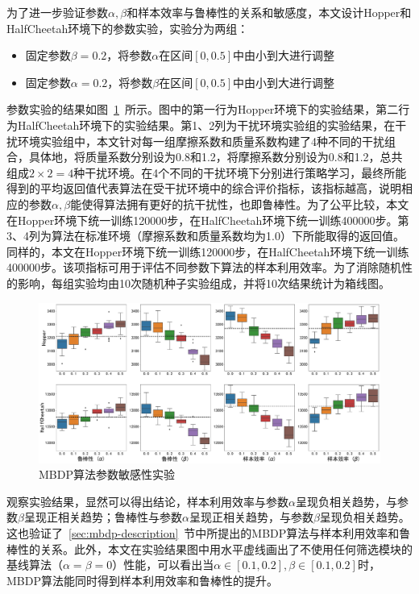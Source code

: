 为了进一步验证参数$\alpha,\beta$和样本效率与鲁棒性的关系和敏感度，本文设计Hopper和HalfCheetah环境下的参数实验，实验分为两组：

\begin{itemize}
    \item 固定参数$\beta=0.2$，将参数$\alpha$在区间$[0,0.5]$中由小到大进行调整
    \item 固定参数$\alpha=0.2$，将参数$\beta$在区间$[0,0.5]$中由小到大进行调整
\end{itemize}

参数实验的结果如图~\ref{fig:hyper-performance}~所示。图中的第一行为Hopper环境下的实验结果，第二行为HalfCheetah环境下的实验结果。第1、2列为干扰环境实验组的实验结果，在干扰环境实验组中，本文针对每一组摩擦系数和质量系数构建了4种不同的干扰组合，具体地，将质量系数分别设为0.8和1.2，将摩擦系数分别设为0.8和1.2，总共组成$2\times 2=4$种干扰环境。在4个不同的干扰环境下分别进行策略学习，最终所能得到的平均返回值代表算法在受干扰环境中的综合评价指标，该指标越高，说明相应的参数$\alpha,\beta$能使得算法拥有更好的抗干扰性，也即鲁棒性。为了公平比较，本文在Hopper环境下统一训练120000步，在HalfCheetah环境下统一训练400000步。第3、4列为算法在标准环境（摩擦系数和质量系数均为1.0）下所能取得的返回值。同样的，本文在Hopper环境下统一训练120000步，在HalfCheetah环境下统一训练400000步。该项指标可用于评估不同参数下算法的样本利用效率。为了消除随机性的影响，每组实验均由10次随机种子实验组成，并将10次结果统计为箱线图。

\begin{figure}[ht]
  \centering
  \includegraphics[width=\textwidth]{figures/hyper-performance.pdf}
  \caption{MBDP算法参数敏感性实验}
  \label{fig:hyper-performance}
\end{figure}

观察实验结果，显然可以得出结论，样本利用效率与参数$\alpha$呈现负相关趋势，与参数$\beta$呈现正相关趋势；鲁棒性与参数$\alpha$呈现正相关趋势，与参数$\beta$呈现负相关趋势。这也验证了~\ref{sec:mbdp-description}~节中所提出的MBDP算法与样本利用效率和鲁棒性的关系。此外，本文在实验结果图中用水平虚线画出了不使用任何筛选模块的基线算法（$\alpha=\beta=0$）性能，可以看出当$\alpha\in[0.1,0.2],\beta\in[0.1,0.2]$时，MBDP算法能同时得到样本利用效率和鲁棒性的提升。

